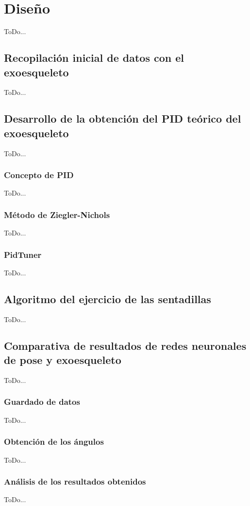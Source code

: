 \chapter{Diseño}
\label{cap:capitulo4}

ToDo...

\section{Recopilación inicial de datos con el exoesqueleto}
\label{sec:primeros_datos_exoesqueleto}

ToDo...

\section{Desarrollo de la obtención del PID teórico del exoesqueleto}
\label{sec:desarrollo_de_la_obtencion_del pid_teorico_del_exoesqueleto}

ToDo...

\subsection{Concepto de PID}
\label{subsec:concepto_de_pid}

ToDo...

\subsection{Método de Ziegler-Nichols}
\label{subsec:metodo_de_ziegler_nichols}

ToDo...

\subsection{PidTuner}
\label{subsec:pidtuner}

ToDo...

\section{Algoritmo del ejercicio de las sentadillas}
\label{sec:algoritmo_ejercicio_sentadillas}

ToDo...

\section{Comparativa de resultados de redes neuronales de pose y exoesqueleto}
\label{sec:comparativa_redes_pose_exoesqueleto}

ToDo...

\subsection{Guardado de datos}
\label{subsec:guardado_datos}

ToDo...

\subsection{Obtención de los ángulos}
\label{subsec:obtencion_angulos}

ToDo...

\subsection{Análisis de los resultados obtenidos}
\label{subsec:analisis_resultados_obtenidos}

ToDo...